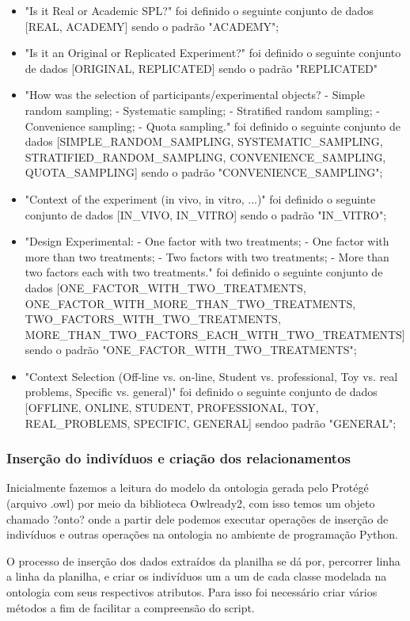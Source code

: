 \begin{itemize}
	\item "Is it Real or Academic SPL?" foi definido o seguinte conjunto de dados [REAL, ACADEMY] sendo o padrão "ACADEMY";
	\item "Is it an Original or Replicated Experiment?" foi definido o seguinte conjunto de dados [ORIGINAL, REPLICATED] sendo o padrão "REPLICATED"
	\item "How was the selection of participants/experimental objects? - Simple random sampling; - Systematic sampling; - Stratified random sampling; - Convenience sampling; - Quota sampling." foi definido o seguinte conjunto de dados [SIMPLE\_RANDOM\_SAMPLING, SYSTEMATIC\_SAMPLING, STRATIFIED\_RANDOM\_SAMPLING,	CONVENIENCE\_SAMPLING, QUOTA\_SAMPLING] sendo o padrão "CONVENIENCE\_SAMPLING";
	\item "Context of the experiment (in vivo, in vitro, ...)" foi definido o seguinte conjunto de dados [IN\_VIVO, IN\_VITRO] sendo o padrão "IN\_VITRO";
	\item "Design Experimental: - One factor with two treatments; - One factor with more than two treatments; - Two factors with two treatments; - More than two factors each with two treatments." foi definido o seguinte conjunto de dados [ONE\_FACTOR\_WITH\_TWO\_TREATMENTS, ONE\_FACTOR\_WITH\_MORE\_THAN\_TWO\_TREATMENTS, TWO\_FACTORS\_WITH\_TWO\_TREATMENTS, MORE\_THAN\_TWO\_FACTORS\_EACH\_WITH\_TWO\_TREATMENTS] sendo o padrão "ONE\_FACTOR\_WITH\_TWO\_TREATMENTS";
	\item "Context Selection (Off-line vs. on-line, Student vs. professional, Toy vs. real problems, Specific vs. general)" foi definido o seguinte conjunto de dados [OFFLINE, ONLINE, STUDENT, PROFESSIONAL, TOY, REAL\_PROBLEMS, SPECIFIC, GENERAL] sendoo padrão "GENERAL";
\end{itemize}

\subsubsection{Inserção do indivíduos e criação dos relacionamentos}

Inicialmente fazemos a leitura do modelo da ontologia gerada pelo Protégé (arquivo .owl) por meio da biblioteca Owlready2, com isso temos um objeto chamado ?onto? onde a partir dele podemos executar operações de inserção de indivíduos e outras operações na ontologia no ambiente de programação Python.

O processo de inserção dos dados extraídos da planilha se dá por, percorrer linha a linha da planilha, e criar os indivíduos um a um de cada classe modelada na ontologia com seus respectivos atributos. Para isso foi necessário criar vários métodos a fim de facilitar a compreensão do script.

